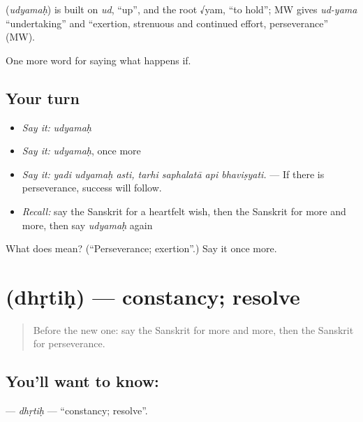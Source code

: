 \begin{cousinweb}
\textbf{} (\emph{udyamaḥ}) is built on \emph{ud}, \textquotedblleft{}up\textquotedblright{}, and the root √yam, \textquotedblleft{}to hold\textquotedblright{}; MW gives \emph{ud-yama} \textquotedblleft{}undertaking\textquotedblright{} and \textquotedblleft{}exertion, strenuous and continued effort, perseverance\textquotedblright{} (MW).
\end{cousinweb}

\begin{grammarlens}[title={What you've built}]
One more word for saying what happens if.
\end{grammarlens}

\subsection*{Your turn}
\begin{itemize}
\raggedright
  \item \emph{Say it:} \emph{udyamaḥ}
  \item \emph{Say it:} \emph{udyamaḥ}, once more
  \item \emph{Say it:} \emph{yadi udyamaḥ asti, tarhi saphalatā api bhaviṣyati.} — If there is perseverance, success will follow.
  \item \emph{Recall:} say the Sanskrit for a heartfelt wish, then the Sanskrit for more and more, then say \emph{udyamaḥ} again
\end{itemize}

\begin{tcolorbox}[breakable,colback=teal!4,colframe=teal!35!black,title={Before you move on}]
What does  mean? (\textquotedblleft{}Perseverance; exertion\textquotedblright{}.) Say it once more.
\end{tcolorbox}
\section[\texorpdfstring{\sk{धृतिः} (dhṛtiḥ)}{धृतिः (dhṛtiḥ)}]{ (dhṛtiḥ) — constancy; resolve}

\label{lesson:SA-C384-dhrtih}



\begin{quote}
Before the new one: say the Sanskrit for more and more, then the Sanskrit for perseverance.
\end{quote}

\subsection*{You'll want to know: }
\textbf{} — \emph{dhṛtiḥ} — \textquotedblleft{}constancy; resolve\textquotedblright{}.

